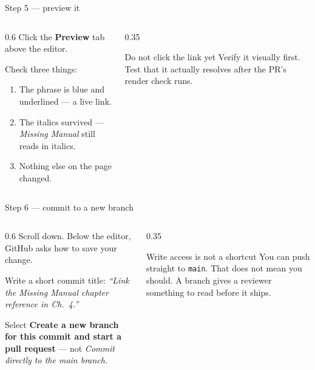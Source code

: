 \documentclass[9pt,aspectratio=169]{beamer}
\begin{document}
\begin{frame}{Step 5 --- preview it}
    \begin{columns}[T]
        \begin{column}{0.6\textwidth}
            Click the \textbf{Preview} tab above the editor.

            \medskip
            Check three things:
            \begin{enumerate}\small
                \item The phrase is blue and underlined --- a live link.
                \item The italics survived --- \textit{Missing Manual} still reads in italics.
                \item Nothing else on the page changed.
            \end{enumerate}
        \end{column}
        \begin{column}{0.35\textwidth}
            \begin{alertblock}{Do not click the link yet}
                \footnotesize Verify it visually first. Test that it actually resolves after the PR's render check runs.
            \end{alertblock}
        \end{column}
    \end{columns}
\end{frame}

\begin{frame}{Step 6 --- commit to a new branch}
    \begin{columns}[T]
        \begin{column}{0.6\textwidth}
            Scroll down. Below the editor, GitHub asks how to save your change.

            \medskip
            Write a short commit title: \textit{``Link the Missing Manual chapter reference in Ch.~4.''}

            \medskip
            Select \textbf{Create a new branch for this commit and start a pull request} --- not \textit{Commit directly to the main branch}.
        \end{column}
        \begin{column}{0.35\textwidth}
            \begin{alertblock}{Write access is not a shortcut}
                \footnotesize You can push straight to \texttt{main}. That does not mean you should. A branch gives a reviewer something to read before it ships.
            \end{alertblock}
        \end{column}
    \end{columns}
\end{frame}
\end{document}
